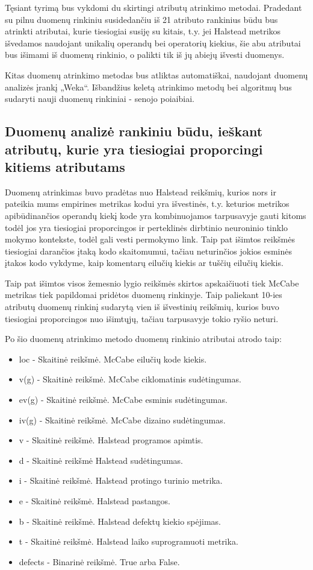 \documentclass{VUMIFPSbakalaurinis}
\begin{document}
Tęsiant tyrimą bus vykdomi du skirtingi atributų atrinkimo metodai. Pradedant su pilnu duomenų rinkiniu susidedančiu iš 21 atributo rankinius būdu bus atrinkti atributai, kurie tiesiogiai susiję su kitais, t.y. jei Halstead metrikos išvedamos naudojant unikalių operandų bei operatorių kiekius, šie abu atributai bus išimami iš duomenų rinkinio, o palikti tik iš jų abiejų išvesti duomenys.

Kitas duomenų atrinkimo metodas bus atliktas automatiškai, naudojant duomenų analizės įrankį „Weka“. Išbandžius keletą atrinkimo metodų bei algoritmų bus sudaryti nauji duomenų rinkiniai - senojo poiaibiai.

\subsection{Duomenų analizė rankiniu būdu, ieškant atributų, kurie yra tiesiogiai proporcingi kitiems atributams}

Duomenų atrinkimas buvo pradėtas nuo Halstead reikšmių, kurios nors ir pateikia mums empirines metrikas kodui yra išvestinės, t.y. keturios metrikos apibūdinančios operandų kiekį kode yra kombinuojamos tarpusavyje gauti kitoms todėl jos yra tiesiogiai proporcingos ir perteklinės dirbtinio neuroninio tinklo mokymo kontekste, todėl gali vesti permokymo link. Taip pat išimtos reikšmės tiesiogiai darančios įtaką kodo skaitomumui, tačiau neturinčios jokios esminės įtakos kodo vykdyme, kaip komentarų eilučių kiekis ar tuščių eilučių kiekis.

Taip pat išimtos visos žemesnio lygio reikšmės skirtos apskaičiuoti tiek McCabe metrikas tiek papildomai pridėtos duomenų rinkinyje. Taip paliekant 10-ies atributų duomenų rinkinį sudarytą vien iš išvestinių reikšmių, kurios buvo tiesiogiai proporcingos nuo išimtųjų, tačiau tarpusavyje tokio ryšio neturi.

Po šio duomenų atrinkimo metodo duomenų rinkinio atributai atrodo taip:
\begin{itemize} 
\item[] loc - Skaitinė reikšmė. McCabe eilučių kode kiekis.
\item[] v(g) - Skaitinė reikšmė. McCabe ciklomatinis sudėtingumas.
\item[] ev(g) - Skaitinė reikšmė. McCabe esminis sudėtingumas.
\item[] iv(g) - Skaitinė reikšmė. McCabe dizaino sudėtingumas.
\item[] v - Skaitinė reikšmė. Halstead programos apimtis.
\item[] d - Skaitinė reikšmė Halstead sudėtingumas.
\item[] i - Skaitinė reikšmė. Halstead protingo turinio metrika.
\item[] e - Skaitinė reikšmė. Halstead pastangos.
\item[] b - Skaitinė reikšmė. Halstead defektų kiekio spėjimas.
\item[] t - Skaitinė reikšmė. Halstead laiko suprogramuoti metrika.
\item[] defects - Binarinė reikšmė. True arba False.
\end{itemize} 
\end{document}
